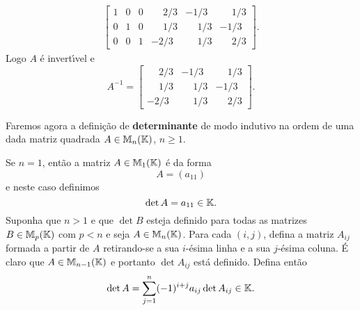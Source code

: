 \begin{exemplo}
\begin{solucao}
\begin{align*}
\begin{bmatrix}
1 & 0 & 0 & \phantom{-}2/3 & -1/3 & \phantom{-}1/3 \\
0 & 1 & 0 & \phantom{-}1/3 & \phantom{-}1/3 & -1/3\\
0 & 0 & 1 & -2/3 & \phantom{-}1/3 & \phantom{-}2/3
\end{bmatrix}.
\end{align*}
Logo $A$ \'e invert{\'\i}vel e
\[
A^{-1} = \begin{bmatrix}
\phantom{-}2/3 & -1/3 & \phantom{-}1/3 \\
\phantom{-}1/3 & \phantom{-}1/3 & -1/3\\
-2/3 & \phantom{-}1/3 & \phantom{-}2/3
\end{bmatrix}.
\]
\end{solucao}
\end{exemplo}

Faremos agora a defini\c{c}\~ao de \textbf{determinante} de modo indutivo na ordem de uma dada matriz quadrada $A \in \mathbb{M}_n(\mathbb{K})$, $n \ge 1$.

Se $n = 1$, ent\~ao a matriz $A \in \mathbb{M}_1(\mathbb{K})$ \'e da forma
\[
A = (a_{11})
\]
e neste caso definimos
\[
\det A = a_{11} \in \mathbb{K}.
\]
Suponha que $n > 1$ e que $\det B$ esteja definido para todas as matrizes  $B \in \mathbb{M}_p(\mathbb{K})$ com $p < n$ e seja 
$A \in \mathbb{M}_n(\mathbb{K})$. Para cada $(i,j)$, defina a matriz $A_{ij}$ formada a partir de $A$ retirando-se a sua $i$-\'esima linha e a sua $j$-\'esima coluna. \'E claro que $A \in \mathbb{M}_{n - 1}(\mathbb{K})$ e portanto $\det A_{ij}$ est\'a definido. Defina ent\~ao
\[
\det A = \sum_{j = 1}^n(-1)^{i + j}a_{ij}\det A_{ij} \in \mathbb{K}.
\]

